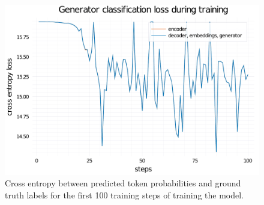 \begin{figure}
    \centering
    \includegraphics[width=0.7\linewidth]{training-loss-bert-abs-100.pdf}
    \caption{Cross entropy between predicted token probabilities and ground truth labels for the first 100 training steps of training the \BertSumAbs model.}
    \label{training-loss-bert-abs}
\end{figure}
